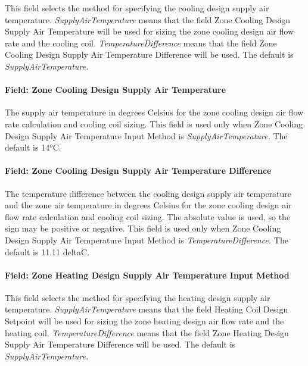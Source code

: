 This field selects the method for specifying the cooling design supply air temperature. \emph{SupplyAirTemperature} means that the field Zone Cooling Design Supply Air Temperature will be used for sizing the zone cooling design air flow rate and the cooling coil. \emph{TemperatureDifference} means that the field Zone Cooling Design Supply Air Temperature Difference will be used. The default is \emph{SupplyAirTemperature.}

\paragraph{Field: Zone Cooling Design Supply Air Temperature}\label{field-zone-cooling-design-supply-air-temperature-2}

The supply air temperature in degrees Celsius for the zone cooling design air flow rate calculation and cooling coil sizing. This field is used only when Zone Cooling Design Supply Air Temperature Input Method is \emph{SupplyAirTemperature.} The default is 14\(^{o}\)C.

\paragraph{Field: Zone Cooling Design Supply Air Temperature Difference}\label{field-zone-cooling-design-supply-air-temperature-difference-3}

The temperature difference between the cooling design supply air temperature and the zone air temperature in degrees Celsius for the zone cooling design air flow rate calculation and cooling coil sizing. The absolute value is used, so the sign may be positive or negative. This field is used only when Zone Cooling Design Supply Air Temperature Input Method is \emph{TemperatureDifference.} The default is 11.11 deltaC.

\paragraph{Field: Zone Heating Design Supply Air Temperature Input Method}\label{field-zone-heating-design-supply-air-temperature-input-method-3}

This field selects the method for specifying the heating design supply air temperature. \emph{SupplyAirTemperature} means that the field Heating Coil Design Setpoint will be used for sizing the zone heating design air flow rate and the heating coil. \emph{TemperatureDifference} means that the field Zone Heating Design Supply Air Temperature Difference will be used. The default is \emph{SupplyAirTemperature.}

